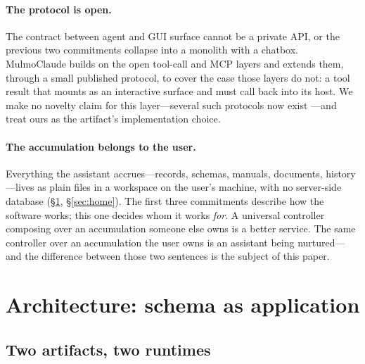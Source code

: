 \documentclass[11pt]{article}
\begin{document}
\paragraph{The protocol is open.}
The contract between agent and GUI surface cannot be a private API, or the
previous two commitments collapse into a monolith with a chatbox. MulmoClaude
builds on the open tool-call and MCP layers and extends them, through a small
published protocol, to cover the case those layers do not: a tool result that
mounts as an interactive surface and must call back into its host. We make no
novelty claim for this layer---several such protocols now exist
\citep{mcp-apps,ag-ui,a2ui}---and treat ours as the artifact's implementation
choice.

\paragraph{The accumulation belongs to the user.}
Everything the assistant accrues---records, schemas, manuals, documents,
history---lives as plain files in a workspace on the user's machine, with no
server-side database (\S\ref{sec:architecture}, \S\ref{sec:home}). The first
three commitments describe how the software works; this one decides whom it works
\emph{for}. A universal controller composing over an accumulation someone else
owns is a better service. The same controller over an accumulation the user owns
is an assistant being nurtured---and the difference between those two sentences
is the subject of this paper.

\section{Architecture: schema as application}
\label{sec:architecture}

\subsection{Two artifacts, two runtimes}
\label{sec:two-artifacts}
\end{document}
